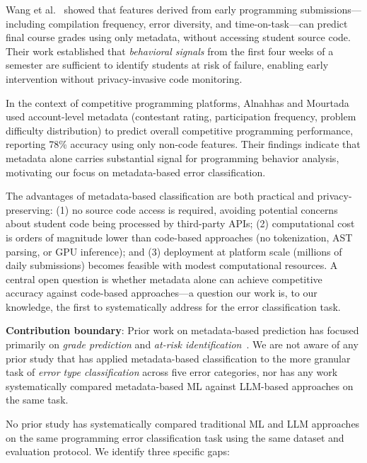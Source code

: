 \documentclass[acmsmall]{acmart}
\begin{document}
Wang et al.~\cite{wang2017learning} showed that features derived from early
programming submissions---including compilation frequency, error diversity,
and time-on-task---can predict final course grades using only metadata,
without accessing student source code. Their work established that
\textit{behavioral signals} from the first four weeks of a semester
are sufficient to identify students at risk of failure, enabling early
intervention without privacy-invasive code monitoring.

In the context of competitive programming platforms, Alnahhas and
Mourtada~\cite{alnahhas2020predicting} used account-level metadata (contestant
rating, participation frequency, problem difficulty distribution) to predict
overall competitive programming performance, reporting 78\% accuracy using
only non-code features. Their findings indicate that metadata alone carries
substantial signal for programming behavior analysis, motivating our focus on
metadata-based error classification.

The advantages of metadata-based classification are both practical and
privacy-preserving: (1) no source code access is required, avoiding
potential concerns about student code being processed by third-party APIs;
(2) computational cost is orders of magnitude lower than code-based
approaches (no tokenization, AST parsing, or GPU inference); and
(3) deployment at platform scale (millions of daily submissions) becomes
feasible with modest computational resources. A central open question
is whether metadata alone can achieve competitive accuracy against
code-based approaches---a question our work is, to our knowledge, the first to
systematically
address for the error classification task.

\noindent\textbf{Contribution boundary}: Prior work on metadata-based prediction
has focused primarily on \textit{grade prediction} and \textit{at-risk
identification}~\cite{wang2017learning,pears2007survey}. We are not aware of
any prior study that has applied metadata-based classification to the more
granular task of \textit{error type classification} across five error
categories, nor has any work systematically compared metadata-based ML against
LLM-based approaches on the same task.

No prior study has systematically compared traditional ML and
LLM approaches on the same programming error classification task using the
same dataset and evaluation protocol. We identify three specific gaps:
\end{document}
